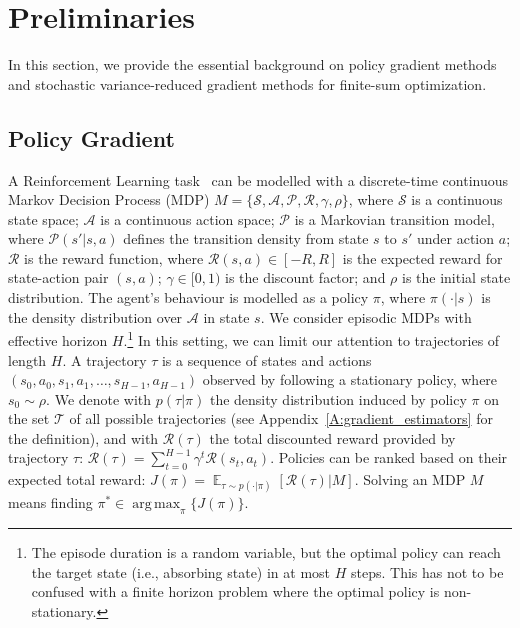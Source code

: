\documentclass{article}
\makeatletter
\theoremstyle{remark}
\theoremstyle{definition}
\DeclareRobustCommand{\ie}{i.e.,\@\xspace}
\DeclareMathOperator*{\argmax}{arg\,max}
\DeclareMathOperator*{\EV}{\mathbb{E}}
\newcommand{\EVV}[2][\ppvect \in \ppspace]{\EV_{#1}\left[{#2}\right]}
\newcommand{\Aspace}{\mathcal{A}}
\newcommand{\Sspace}{\mathcal{S}}
\newcommand{\Tspace}{\mathcal{T}}
\newcommand{\Transition}{\mathcal{P}}
\newcommand{\Reward}{\mathcal{R}}
\makeatother
\begin{document}
\vspace{-0.05in}
\section{Preliminaries}\label{sec:pre}
\vspace{-0.05in}
In this section, we provide the essential background on policy gradient methods and stochastic variance-reduced gradient methods for finite-sum optimization.

\vspace{-0.05in}
\subsection{Policy Gradient}\label{subsec:PolicyGradient}
\vspace{-0.05in}
A Reinforcement Learning task~\citep{sutton1998reinforcement} can be modelled with a discrete-time continuous Markov Decision Process (MDP) $M = \{\Sspace,\Aspace,\Transition,\Reward,\gamma,\rho\}$, where $\Sspace$ is a continuous state space; $\Aspace$ is a continuous action space; $\Transition$ is a Markovian transition model, where $\Transition(s'|s,a)$ defines the transition density from state $s$ to $s'$ under action $a$; $\Reward$ is the reward function, where $\Reward(s,a) \in [-R,R]$ is the expected reward for state-action pair $(s,a)$;
$\gamma\in[0,1)$ is the discount factor; and $\rho$ is the initial state distribution.
The agent's behaviour is modelled as a policy $\pi$, where $\pi(\cdot|s)$ is the density distribution over $\Aspace$ in state $s$.
We consider episodic MDPs with effective horizon $H$.\footnote{The episode duration is a random variable, but the optimal policy can reach the target state (\ie absorbing state) in at most $H$ steps. This has not to be confused with a finite horizon problem where the optimal policy is non-stationary.} In this setting, we can limit our attention to trajectories of length $H$. A trajectory $\tau$ is a sequence of states and actions $(s_0,a_0,s_1,a_1,\dots,s_{H-1},a_{H-1})$ observed by following a stationary policy, where $s_0 \sim \rho$.
We denote with $p(\tau|\pi)$ the density distribution induced by policy $\pi$ on the set $\Tspace$ of all possible trajectories (see Appendix~\ref{A:gradient_estimators} for the definition), and with $\Reward(\tau)$ the total discounted reward provided by trajectory $\tau$:
%
$\Reward(\tau) = \sum_{t=0}^{H-1}\gamma^t\Reward(s_t,a_t).$
%
Policies can be ranked based on their expected total reward: $J(\pi) = \EVV[\tau \sim p(\cdot|\pi)]{\Reward(\tau)|M}$.
Solving an MDP $M$ means finding $\pi^* \in \argmax_{\pi} \{J(\pi)\}$.
\end{document}
